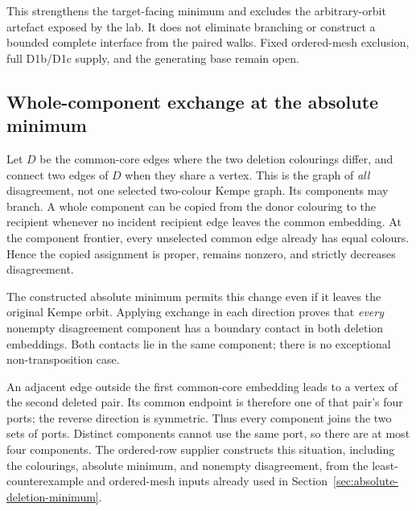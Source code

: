 This strengthens the target-facing minimum and excludes the arbitrary-orbit
artefact exposed by the lab. It does not eliminate branching or construct
a bounded complete interface from the paired walks. Fixed ordered-mesh
exclusion, full D1b/D1c supply, and the generating base remain open.

\subsection{Whole-component exchange at the absolute minimum}
\label{sec:whole-component-exchange}

Let $D$ be the common-core edges where the two deletion colourings differ,
and connect two edges of $D$ when they share a vertex. This is the graph
of \emph{all} disagreement, not one selected two-colour Kempe graph.
Its components may branch. A whole component can be copied from the
donor colouring to the recipient whenever no incident recipient edge
leaves the common embedding. At the component frontier, every unselected
common edge already has equal colours. Hence the copied assignment is
proper, remains nonzero, and strictly decreases disagreement.

The constructed absolute minimum permits this change even if it leaves
the original Kempe orbit. Applying exchange in each direction proves
that \emph{every} nonempty disagreement component has a boundary contact
in both deletion embeddings. Both contacts lie in the same component;
there is no exceptional non-transposition case.

An adjacent edge outside the first common-core embedding leads to a
vertex of the second deleted pair. Its common endpoint is therefore one
of that pair's four ports; the reverse direction is symmetric. Thus every
component joins the two sets of ports. Distinct components cannot use the
same port, so there are at most four components. The ordered-row supplier
constructs this situation, including the colourings, absolute minimum,
and nonempty disagreement, from the least-counterexample and ordered-mesh
inputs already used in Section~\ref{sec:absolute-deletion-minimum}.

